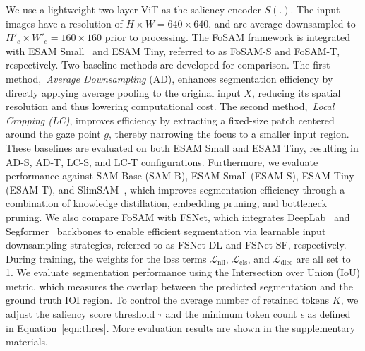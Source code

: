 \documentclass{article}
\begin{document}
We use a lightweight two-layer ViT as the saliency encoder $S(.)$. The input images have a resolution of $H \times W = 640 \times 640$, and are average downsampled to $H'_e \times W'_e = 160 \times 160$ prior to processing. The FoSAM framework is integrated with ESAM Small~\cite{xiong2024efficientsam} and ESAM Tiny, referred to as FoSAM-S and FoSAM-T, respectively. Two baseline methods are developed for comparison. The first method,~\textit{Average Downsampling} (AD), enhances segmentation efficiency by directly applying average pooling to the original input $X$, reducing its spatial resolution and thus lowering computational cost. The second method,~\textit{Local Cropping (LC)}, improves efficiency by extracting a fixed-size patch centered around the gaze point $g$, thereby narrowing the focus to a smaller input region. These baselines are evaluated on both ESAM Small and ESAM Tiny, resulting in AD-S, AD-T, LC-S, and LC-T configurations. Furthermore, we evaluate performance against SAM Base (SAM-B), ESAM Small (ESAM-S), ESAM Tiny (ESAM-T), and SlimSAM~\cite{Chen2024NEURIPS}, which improves segmentation efficiency through a combination of knowledge distillation, embedding pruning, and bottleneck pruning. We also compare FoSAM with FSNet, which integrates DeepLab~\cite{he2016deep} and Segformer~\cite{xie2021segformer} backbones to enable efficient segmentation via learnable input downsampling strategies, referred to as FSNet-DL and FSNet-SF, respectively. 
During training, the weights for the loss terms $\mathcal{L}_{\mathrm{nll}}$, $\mathcal{L}_{\mathrm{cls}}$, and $\mathcal{L}_{\mathrm{dice}}$ are all set to 1. We evaluate segmentation performance using the Intersection over Union (IoU) metric, which measures the overlap between the predicted segmentation and the ground truth IOI region. To control the average number of retained tokens $K$, we adjust the saliency score threshold $\tau$ and the minimum token count $\epsilon$ as defined in Equation~\ref{eqn:thres}. More evaluation results are shown in the supplementary materials.
\end{document}
